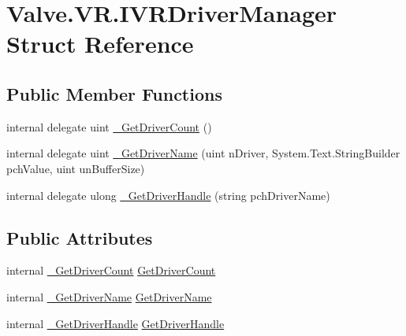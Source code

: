 \hypertarget{struct_valve_1_1_v_r_1_1_i_v_r_driver_manager}{}\section{Valve.\+V\+R.\+I\+V\+R\+Driver\+Manager Struct Reference}
\label{struct_valve_1_1_v_r_1_1_i_v_r_driver_manager}
\subsection*{Public Member Functions}
\begin{DoxyCompactItemize}
\item 
internal delegate uint \mbox{\hyperlink{struct_valve_1_1_v_r_1_1_i_v_r_driver_manager_a3f4779d5c5c112ee3d6aef2460b812e7}{\+\_\+\+Get\+Driver\+Count}} ()
\item 
internal delegate uint \mbox{\hyperlink{struct_valve_1_1_v_r_1_1_i_v_r_driver_manager_a57559315b7fa733ce6d229a0a09ebddb}{\+\_\+\+Get\+Driver\+Name}} (uint n\+Driver, System.\+Text.\+String\+Builder pch\+Value, uint un\+Buffer\+Size)
\item 
internal delegate ulong \mbox{\hyperlink{struct_valve_1_1_v_r_1_1_i_v_r_driver_manager_accb66a40c924f73c45ee373874ac69e7}{\+\_\+\+Get\+Driver\+Handle}} (string pch\+Driver\+Name)
\end{DoxyCompactItemize}
\subsection*{Public Attributes}
\begin{DoxyCompactItemize}
\item 
internal \mbox{\hyperlink{struct_valve_1_1_v_r_1_1_i_v_r_driver_manager_a3f4779d5c5c112ee3d6aef2460b812e7}{\+\_\+\+Get\+Driver\+Count}} \mbox{\hyperlink{struct_valve_1_1_v_r_1_1_i_v_r_driver_manager_aefb6e076f538c8f168025cf250f563cb}{Get\+Driver\+Count}}
\item 
internal \mbox{\hyperlink{struct_valve_1_1_v_r_1_1_i_v_r_driver_manager_a57559315b7fa733ce6d229a0a09ebddb}{\+\_\+\+Get\+Driver\+Name}} \mbox{\hyperlink{struct_valve_1_1_v_r_1_1_i_v_r_driver_manager_a7d36f70366da7d42dba73393083c6cdd}{Get\+Driver\+Name}}
\item 
internal \mbox{\hyperlink{struct_valve_1_1_v_r_1_1_i_v_r_driver_manager_accb66a40c924f73c45ee373874ac69e7}{\+\_\+\+Get\+Driver\+Handle}} \mbox{\hyperlink{struct_valve_1_1_v_r_1_1_i_v_r_driver_manager_a5c0cff9a7d7f49a0b64ebb6afaa30e9a}{Get\+Driver\+Handle}}
\end{DoxyCompactItemize}


